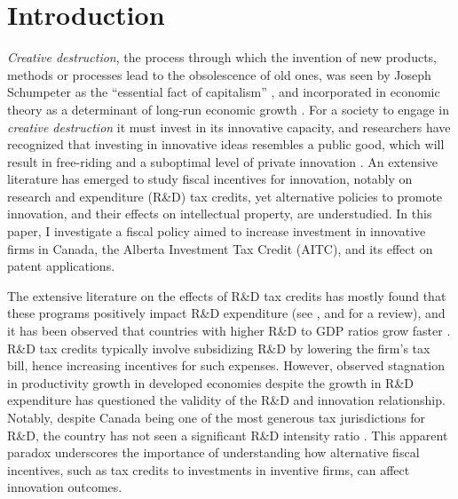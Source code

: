 \documentclass[../main.tex]{subfiles}
\begin{document}
\section{Introduction}
\label{sec:introduction}

\textit{Creative destruction}, the process through which the invention of new products, methods or processes lead to the obsolescence of old ones, was seen by Joseph Schumpeter as the \enquote{essential fact of capitalism} \parencite[p.24]{caballero10}, and incorporated in economic theory as a determinant of long-run economic growth \parencite{aghion_howitt92, artz_etal10, jones95}. For a society to engage in \textit{creative destruction} it must invest in its innovative capacity, and researchers have recognized that investing in innovative ideas resembles a public good, which will result in free-riding and a suboptimal level of private innovation \parencite{bloom_etal19}. An extensive literature has emerged to study fiscal incentives for innovation, notably on research and expenditure (R\&D) tax credits, yet alternative policies to promote innovation, and their effects on intellectual property, are understudied. In this paper, I investigate a fiscal policy aimed to increase investment in innovative firms in Canada, the Alberta Investment Tax Credit (AITC), and its effect on patent applications. 

The extensive literature on the effects of R\&D tax credits has mostly found that these programs positively impact R\&D expenditure (see \textcite{becker15}, \textcite{hall_etal10} and \textcite{hall_vanreenen00} for a review), and it has been observed that countries with higher R\&D to GDP ratios grow faster \textcite{jones16}. R\&D tax credits typically involve subsidizing R\&D by lowering the firm's tax bill, hence increasing incentives for such expenses. However, observed stagnation in productivity growth in developed economies despite the growth in R\&D expenditure has questioned the validity of the R\&D and innovation relationship. Notably, despite Canada being one of the most generous tax jurisdictions for R\&D, the country has not seen a significant R\&D intensity ratio \parencite{mckenzie06}. This apparent paradox underscores the importance of understanding how alternative fiscal incentives, such as tax credits to investments in inventive firms, can affect innovation outcomes.
\end{document}
